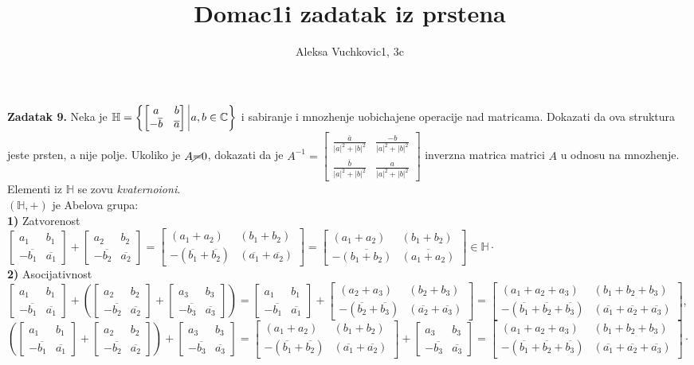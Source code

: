 \documentclass[11pt]{article}
\title{\bf{Domac1i zadatak iz prstena}}
\author{\Large Aleksa Vuchkovic1, 3c}
\date{}
\newcommand\eng{\fontencoding{OT1}\fontfamily{\rmdefault}\selectfont}
\newcommand{\bm}{\begin{bmatrix}}
\newcommand{\enm}{\end{bmatrix}}
\newcommand{\ov}{\overline}
\begin{document}
\maketitle
\large
\textbf{Zadatak 9.} Neka je $\mathbb{H}=\left\{\bm a&b\\-\ov{b}&\ov{a} \enm\;\vline a,b\in\mathbb{C}\right\}$ i sabiranje i mnozhenje uobichajene operacije nad matricama. Dokazati da ova struktura jeste prsten, a nije polje. Ukoliko je $A\cancel{=}0$, dokazati da je $A^{-1}=\bm \frac{\ov{a}}{|a|^2+|b|^2}&\frac{-b}{|a|^2+|b|^2}\\\frac{\ov{b}}{|a|^2+|b|^2}&\frac{a}{|a|^2+|b|^2}\enm$ inverzna matrica matrici $A$ u odnosu na mnozhenje. Elementi iz $\mathbb{H}$ se zovu \textit{kvaternoioni}.\\

\textbf{\eng{I}} $(\mathbb{H},+)$ je Abelova grupa:\\
\textbf{1)} Zatvorenost\\
$\bm a_1&b_1\\-\ov{b_1}&\ov{a_1}\enm + \bm a_2&b_2\\-\ov{b_2}&\ov{a_2}\enm = \bm (a_1+a_2)&(b_1+b_2)\\-(\ov{b_1}+\ov{b_2})&(\ov{a_1}+\ov{a_2})\enm=\bm (a_1+a_2)&(b_1+b_2)\\-\ov{(b_1+b_2)}&\ov{(a_1+a_2)}\enm\in\mathbb{H}\cdot$\\
\textbf{2)} Asocijativnost\\
\small$\bm a_1&b_1\\-\ov{b_1}&\ov{a_1}\enm + \left(\bm a_2&b_2\\-\ov{b_2}&\ov{a_2}\enm + \bm a_3&b_3\\-\ov{b_3}&\ov{a_3}\enm\right) = \bm a_1&b_1\\-\ov{b_1}&\ov{a_1}\enm + \bm (a_2+a_3)&(b_2+b_3)\\-(\ov{b_2}+\ov{b_3})&(\ov{a_2}+\ov{a_3})\enm = \bm (a_1+a_2+a_3)&(b_1+b_2+b_3)\\-(\ov{b_1}+\ov{b_2}+\ov{b_3})&(\ov{a_1}+\ov{a_2}+\ov{a_3})\enm$,\\
\small$\left(\bm a_1&b_1\\-\ov{b_1}&\ov{a_1}\enm + \bm a_2&b_2\\-\ov{b_2}&\ov{a_2}\enm\right) + \bm a_3&b_3\\-\ov{b_3}&\ov{a_3}\enm = \bm (a_1+a_2)&(b_1+b_2)\\-(\ov{b_1}+\ov{b_2})&(\ov{a_1}+\ov{a_2})\enm + \bm a_3&b_3\\-\ov{b_3}&\ov{a_3}\enm = \bm (a_1+a_2+a_3)&(b_1+b_2+b_3)\\-(\ov{b_1}+\ov{b_2}+\ov{b_3})&(\ov{a_1}+\ov{a_2}+\ov{a_3})\enm\cdot$\\
\end{document}
